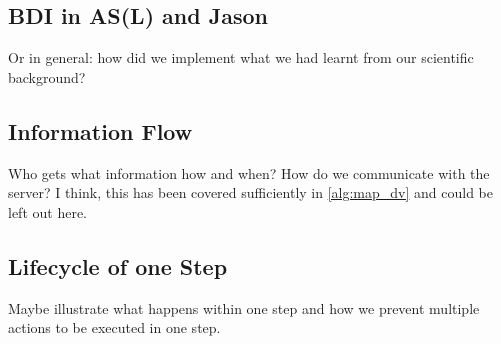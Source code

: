 \subsection{BDI in AS(L) and Jason}
Or in general: how did we implement what we had learnt from our scientific background?
\subsection{Information Flow}
Who gets what information how and when? How do we communicate with the server? I think, this has been covered sufficiently in \autoref{alg:map_dv} and could be left out here.
\subsection{Lifecycle of one Step}
Maybe illustrate what happens within one step and how we prevent multiple actions to be executed in one step.
